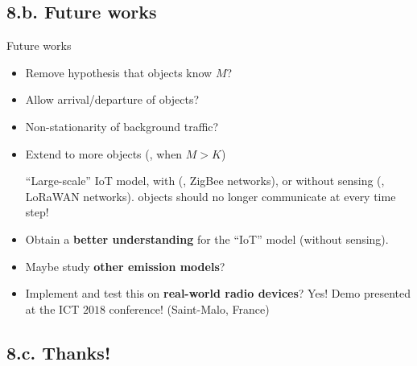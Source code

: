 \documentclass[12pt,english,ignorenonframetext,aspectratio=169,]{beamer}
\providecommand{\tightlist}{%
  \setlength{\itemsep}{0pt}\setlength{\parskip}{0pt}}
\begin{document}
\subsection{\hfill{}8.b. Future works\hfill{}}

\begin{frame}{Future works}

\begin{itemize}\tightlist
\item
  Remove hypothesis that objects know \(M\)?
\item
  Allow arrival/departure of objects?
\item
  Non-stationarity of background traffic?

\item Extend to more objects (\ie, when \(M > K\))

``Large-scale'' IoT model,
with (\eg, ZigBee networks),
or without sensing (\eg, LoRaWAN networks).
\hook objects should no longer communicate at every time step!


\item
  Obtain a \textbf{better understanding} for the ``IoT'' model (without sensing).
\item
  Maybe study \textbf{other emission models}?
\item
  Implement and test this on \textbf{real-world radio devices}?
  \hook Yes! Demo presented at the ICT \(2018\) conference! (Saint-Malo, France)

\end{itemize}

\end{frame}


\subsection{\hfill{}8.c. Thanks!\hfill{}}
\end{document}
